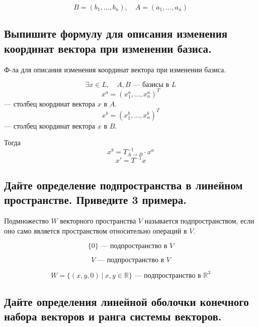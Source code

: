 \begin{remark}
    \[
        B = (b_1, \ldots, b_n),\quad A = (a_1, \ldots, a_n)
    \]
\end{remark}


\subsection{Выпишите формулу для описания изменения координат вектора при изменении базиса.}

\begin{definition}
    Ф-ла для описания изменения координат вектора при изменении базиса.
    
    \[
        \exists x \in L,\quad A, B \text{ --- базисы в } L
    \]
    \[
        x^a = (x_1^a, \ldots, x_n^a)^T
    \]
    --- столбец координат вектора $x$ в $A$.
    \[
        x^b = (x_1^b, \ldots, x_n^b)^T
    \]
    --- столбец координат вектора $x$ в $B$.
    
    Тогда
    \[
        x^b = T^{-1}_{A \to B} \cdot x^a
    \]
    \[
        x' = T^{-1}x
    \]
\end{definition}


\subsection{Дайте определение подпространства в линейном пространстве. Приведите 3 примера.}

\begin{definition}
    Подмножество $W$ векторного пространства $V$ называется подпространством, если оно само является пространством относительно операций в $V$.
\end{definition}
\begin{example}
    \[
        \{0\} \text{ --- подпространство в } V
    \]
\end{example}

\begin{example}
    \[
        V \text{ --- подпространство в } V
    \]
\end{example}

\begin{example}
    \[
        W = \{(x, y, 0)\ |\ x, y \in \mathbb{R}\}
        \text{ --- подпространство в } \mathbb{R}^3
    \]
\end{example}


\subsection{Дайте определения линейной оболочки конечного набора векторов и ранга системы векторов.}

